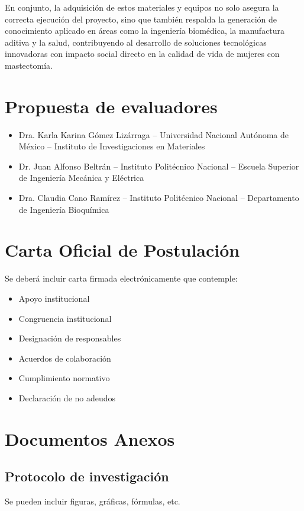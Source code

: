 \documentclass[12pt,a4paper]{article}
\begin{document}
En conjunto, la adquisición de estos materiales y equipos no solo asegura la correcta ejecución
 del proyecto, sino que también respalda la generación de conocimiento aplicado en áreas 
 como la ingeniería biomédica, 
la manufactura aditiva y la salud, contribuyendo al desarrollo de soluciones tecnológicas 
innovadoras con 
impacto social directo en la calidad de vida de mujeres con mastectomía.
\section{Propuesta de evaluadores}

\begin{itemize}
    \item Dra. Karla Karina Gómez Lizárraga -- Universidad Nacional Autónoma de México -- Instituto de Investigaciones en Materiales    
    \item Dr. Juan Alfonso Beltrán  -- Instituto Politécnico Nacional -- Escuela Superior de Ingeniería Mecánica y Eléctrica
    \item Dra. Claudia Cano Ramírez -- Instituto Politécnico Nacional -- Departamento de Ingeniería Bioquímica
\end{itemize}

\section{Carta Oficial de Postulación}

Se deberá incluir carta firmada electrónicamente que contemple:

\begin{itemize}
    \item Apoyo institucional
    \item Congruencia institucional
    \item Designación de responsables
    \item Acuerdos de colaboración
    \item Cumplimiento normativo
    \item Declaración de no adeudos
\end{itemize}

\section{Documentos Anexos}

\subsection{Protocolo de investigación}
Se pueden incluir figuras, gráficas, fórmulas, etc.



\end{document}
